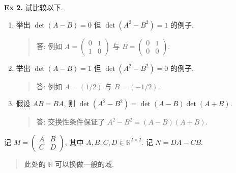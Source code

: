 \documentclass[
]{ctexart}
\begin{document}
\textbf{Ex 2.} 试比较以下.

\begin{enumerate}
\def\labelenumi{\arabic{enumi}.}
\item
  举出 \(\det (A-B)=0\) 但 \(\det (A^2-B^2)=1\) 的例子.

  \begin{quote}
  答: 例如 \(A=\begin{pmatrix}0&1\\1&0\end{pmatrix}\) 与
  \(B=\begin{pmatrix}0&1\\0&0\end{pmatrix}\).
  \end{quote}
\item
  举出 \(\det (A-B)=1\) 但 \(\det (A^2-B^2)=0\) 的例子.

  \begin{quote}
  答: 例如 \(A=(1/2)\) 与 \(B=(-1/2)\).
  \end{quote}
\item
  假设 \(AB=BA\), 则 \(\det (A^2-B^2)=\det (A-B)\det (A+B)\).

  \begin{quote}
  答: 交换性条件保证了 \(A^2-B^2=(A-B)(A+B)\).
  \end{quote}
\end{enumerate}

记 \(M=\begin{pmatrix}A&B\\C&D\end{pmatrix}\), 其中
\(A,B,C,D\in \mathbb R^{2\times 2}\). 记 \(N=DA-CB\).

\begin{quote}
此处的 \(\mathbb R\) 可以换做一般的域.
\end{quote}
\end{document}
